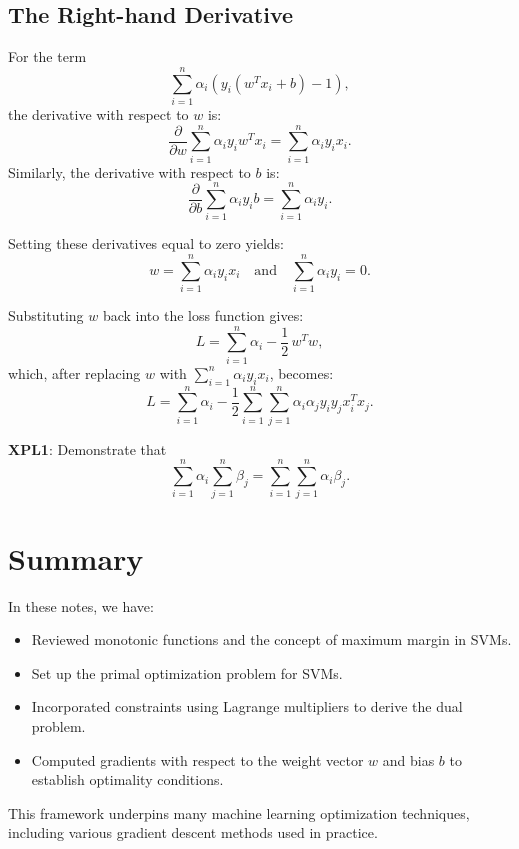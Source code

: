 \subsection{The Right-hand Derivative}
For the term 
\[
\sum_{i=1}^{n} \alpha_i (y_i(w^T x_i + b) - 1),
\]
the derivative with respect to \(w\) is:
\[
\frac{\partial}{\partial w} \sum_{i=1}^{n} \alpha_i y_i w^T x_i = \sum_{i=1}^{n} \alpha_i y_i x_i.
\]
Similarly, the derivative with respect to \(b\) is:
\[
\frac{\partial}{\partial b} \sum_{i=1}^{n} \alpha_i y_i b = \sum_{i=1}^{n} \alpha_i y_i.
\]

Setting these derivatives equal to zero yields:
\[
w = \sum_{i=1}^{n} \alpha_i y_i x_i \quad \text{and} \quad \sum_{i=1}^{n} \alpha_i y_i = 0.
\]

Substituting \(w\) back into the loss function gives:
\[
L = \sum_{i=1}^{n} \alpha_i - \frac{1}{2}\, w^T w,
\]
which, after replacing \(w\) with \(\sum_{i=1}^{n} \alpha_i y_i x_i\), becomes:
\[
L = \sum_{i=1}^{n} \alpha_i - \frac{1}{2} \sum_{i=1}^{n} \sum_{j=1}^{n} \alpha_i \alpha_j y_i y_j x_i^T x_j.
\]

\begin{tcolorbox}
\textbf{XPL1}: Demonstrate that 
\[
\sum_{i=1}^n \alpha_i \sum_{j=1}^n \beta_j = \sum_{i=1}^n \sum_{j=1}^n \alpha_i\beta_j.
\]
\end{tcolorbox}

\section{Summary}
In these notes, we have:
\begin{itemize}
    \item Reviewed monotonic functions and the concept of maximum margin in SVMs.
    \item Set up the primal optimization problem for SVMs.
    \item Incorporated constraints using Lagrange multipliers to derive the dual problem.
    \item Computed gradients with respect to the weight vector \(w\) and bias \(b\) to establish optimality conditions.
\end{itemize}

This framework underpins many machine learning optimization techniques, including various gradient descent methods used in practice.
